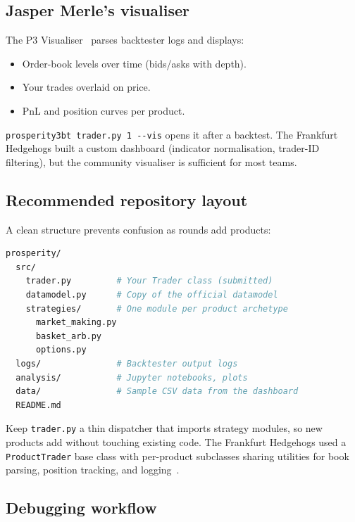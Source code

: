 \subsection{Jasper Merle's visualiser}

The P3 Visualiser~\citep{jmerle_visualiser} parses backtester logs and
displays:
\begin{itemize}
  \item Order-book levels over time (bids/asks with depth).
  \item Your trades overlaid on price.
  \item PnL and position curves per product.
\end{itemize}

\texttt{prosperity3bt trader.py 1 -{}-vis} opens it after a backtest.
The Frankfurt Hedgehogs built a custom dashboard (indicator
normalisation, trader-ID filtering), but the community visualiser is
sufficient for most teams.

\subsection{Recommended repository layout}

A clean structure prevents confusion as rounds add products:

\begin{lstlisting}[language=bash, numbers=none, frame=single,
  caption={Suggested repository layout.}, label={lst:repo_layout}]
prosperity/
  src/
    trader.py         # Your Trader class (submitted)
    datamodel.py      # Copy of the official datamodel
    strategies/       # One module per product archetype
      market_making.py
      basket_arb.py
      options.py
  logs/               # Backtester output logs
  analysis/           # Jupyter notebooks, plots
  data/               # Sample CSV data from the dashboard
  README.md
\end{lstlisting}

Keep \texttt{trader.py} a thin dispatcher that imports strategy
modules, so new products add without touching existing code.  The
Frankfurt Hedgehogs used a \texttt{ProductTrader} base class with
per-product subclasses sharing utilities for book parsing, position
tracking, and logging~\citep{frankfurthedgehogs2025}.

\subsection{Debugging workflow}

